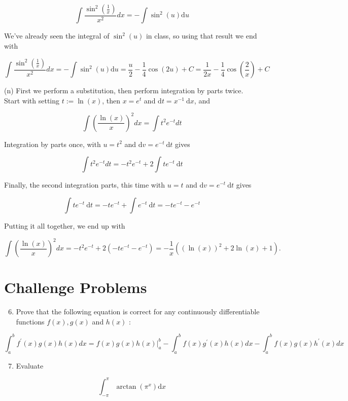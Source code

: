 \documentclass[10pt]{article}
\begin{document}
$$
\int \frac{\sin ^{2}\left(\frac{1}{x}\right)}{x^{2}} d x=-\int \sin ^{2}(u) \mathrm{d} u
$$

We've already seen the integral of $\sin ^{2}(u)$ in class, so using that result we end with

$$
\int \frac{\sin ^{2}\left(\frac{1}{x}\right)}{x^{2}} d x=-\int \sin ^{2}(u) \mathrm{d} u=\frac{u}{2}-\frac{1}{4} \cos (2 u)+C=\frac{1}{2 x}-\frac{1}{4} \cos \left(\frac{2}{x}\right)+C
$$

(n) First we perform a substitution, then perform integration by parts twice. Start with setting $t:=\ln (x)$, then $x=e^{t}$ and $\mathrm{d} t=x^{-1} \mathrm{~d} x$, and

$$
\int\left(\frac{\ln (x)}{x}\right)^{2} d x=\int t^{2} e^{-t} d t
$$

Integration by parts once, with $u=t^{2}$ and $\mathrm{d} v=e^{-t} \mathrm{~d} t$ gives

$$
\int t^{2} e^{-t} d t=-t^{2} e^{-t}+2 \int t e^{-t} \mathrm{~d} t
$$

Finally, the second integration parts, this time with $u=t$ and $\mathrm{d} v=e^{-t} \mathrm{~d} t$ gives

$$
\int t e^{-t} \mathrm{~d} t=-t e^{-t}+\int e^{-t} \mathrm{~d} t=-t e^{-t}-e^{-t}
$$

Putting it all together, we end up with

$$
\int\left(\frac{\ln (x)}{x}\right)^{2} d x=-t^{2} e^{-t}+2\left(-t e^{-t}-e^{-t}\right)=-\frac{1}{x}\left((\ln (x))^{2}+2 \ln (x)+1\right) .
$$

\section*{Challenge Problems}
\begin{enumerate}
  \setcounter{enumi}{5}
  \item Prove that the following equation is correct for any continuously differentiable functions $f(x), g(x)$ and $h(x)$ :
\end{enumerate}

$$
\int_{a}^{b} f^{\prime}(x) g(x) h(x) d x=\left.f(x) g(x) h(x)\right|_{a} ^{b}-\int_{a}^{b} f(x) g^{\prime}(x) h(x) d x-\int_{a}^{b} f(x) g(x) h^{\prime}(x) d x
$$

\begin{enumerate}
  \setcounter{enumi}{6}
  \item Evaluate
\end{enumerate}

$$
\int_{-\pi}^{\pi} \arctan \left(\pi^{x}\right) \mathrm{d} x
$$
\end{document}
